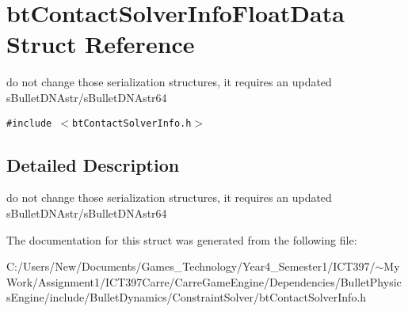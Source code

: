 \hypertarget{structbt_contact_solver_info_float_data}{
\section{btContactSolverInfoFloatData Struct Reference}
\label{structbt_contact_solver_info_float_data}
}
do not change those serialization structures, it requires an updated sBulletDNAstr/sBulletDNAstr64  


{\tt \#include $<$btContactSolverInfo.h$>$}



\subsection{Detailed Description}
do not change those serialization structures, it requires an updated sBulletDNAstr/sBulletDNAstr64 

The documentation for this struct was generated from the following file:\begin{CompactItemize}
\item 
C:/Users/New/Documents/Games\_\-Technology/Year4\_\-Semester1/ICT397/$\sim$My Work/Assignment1/ICT397Carre/CarreGameEngine/Dependencies/BulletPhysicsEngine/include/BulletDynamics/ConstraintSolver/btContactSolverInfo.h\end{CompactItemize}
